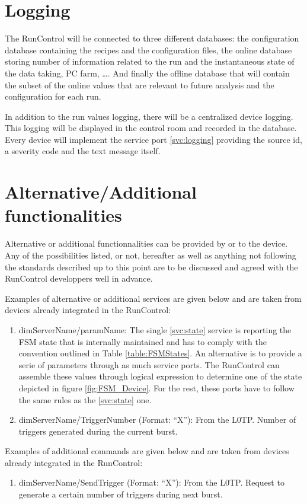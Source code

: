 \documentclass[a4paper]{article}
\begin{document}
\section{Logging}\label{sec:logging}
The RunControl will be connected to three different databases: the configuration database containing
the recipes and the configuration files, the online database storing number of information related
to the run and the instantaneous state of the data taking, PC farm, \ldots. And finally the offline
database that will contain the subset of the online values that are relevant to future analysis and
the configuration for each run.

In addition to the run values logging, there will be a centralized device logging. This logging will
be displayed in the control room and recorded in the database. Every device will implement the
service port \ref{svc:logging} providing the source id, a severity code and the text message itself.

\section{Alternative/Additional functionalities}
Alternative or additional functionnalities can be provided by or to the device. Any of the
possibilities listed, or not, hereafter as well as anything not following the standards described
up to this point are to be discussed and agreed with the RunControl developpers well in advance.

Examples of alternative or additional services are given below and are taken from devices already
integrated in the RunControl:
\begin{enumerate}[label=\textbf{ASVC.\arabic*}]
	\item \label{svc:stateParams} dimServerName/paramName: The single \ref{svc:state}
	service is reporting the FSM state that is internally maintained and has to comply with the
	convention outlined in Table \ref{table:FSMStates}. An alternative is to provide a serie of
	parameters through as much service ports. The RunControl can assemble these values through logical
	expression to determine one of the state depicted in figure \ref{fig:FSM_Device}. For the rest, these ports have
	to follow the same rules as the \ref{svc:state} one.
	\item dimServerName/TriggerNumber (Format: ``X''): From the L0TP. Number of triggers generated
	during the current burst.
\end{enumerate}

Examples of additional commands are given below and are taken from devices already integrated in
the RunControl:
\begin{enumerate}[label=\textbf{ACMD.\arabic*}]
	\item dimServerName/SendTrigger (Format: ``X''): From the L0TP. Request to generate a certain
	number of triggers during next burst.
\end{enumerate}


\thebibliography{}

\end{document}
